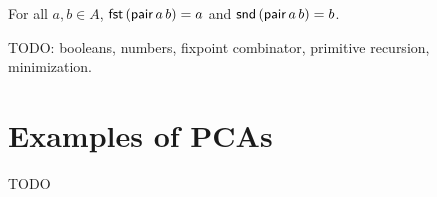 \begin{proposition}
  \label{prop:equal-Pair}
  For all $a, b \in A$, $\mathsf{fst} \, (\mathsf{pair} \, a \, b) = a$ and $\mathsf{snd} \, (\mathsf{pair} \, a \, b) = b$.
\end{proposition}

TODO: booleans, numbers, fixpoint combinator, primitive recursion, minimization.

\section{Examples of PCAs}

TODO


